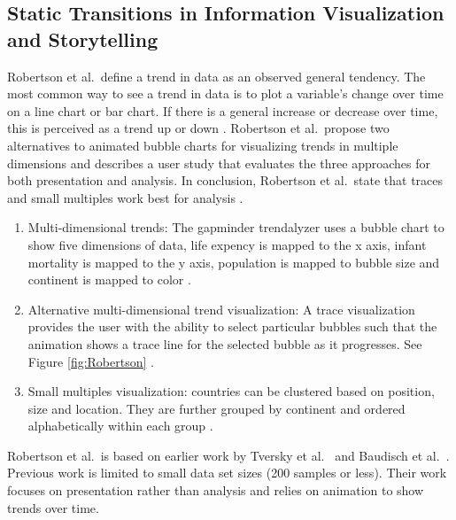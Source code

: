 \documentclass{egpubl}
\begin{document}
\subsection{Static Transitions in Information Visualization and Storytelling}
Robertson et al.\ define a trend in data as an observed general tendency. The most common way to see a trend in data is to plot a variable's change over time on a line chart or bar chart. If there is a general increase or decrease over time, this is perceived as a trend up or down \cite{Rebortson}.
Robertson et al.\ propose two alternatives to animated bubble charts for visualizing trends in multiple dimensions and describes a user study that evaluates the three approaches for both presentation and analysis. In conclusion, Robertson et al.\ state that traces and small multiples work best for analysis \cite{Rebortson}.
\begin{enumerate}
\item Multi-dimensional trends: The gapminder trendalyzer uses a bubble chart to show five dimensions of data, life expency is mapped to the x axis, infant mortality is mapped to the y axis, population is mapped to bubble size and continent is mapped to color \cite{ted1}.
\item Alternative multi-dimensional trend visualization: A trace visualization provides the user with the ability to select particular bubbles such that the animation shows a trace line for the selected bubble as it progresses. See Figure \ref{fig:Robertson} \cite{ted2}.
\item Small multiples visualization: countries can be clustered based on position, size and location. They are further grouped by continent and ordered alphabetically within each group \cite{Tufte}.
\end{enumerate}
Robertson et al.\ is based on earlier work by Tversky et al.\ \cite{tversky} and Baudisch et al.\ \cite{baudisch}. Previous work is limited to small data set sizes (200 samples or less). Their work focuses on presentation rather than analysis and relies on animation to show trends over time.
\end{document}
